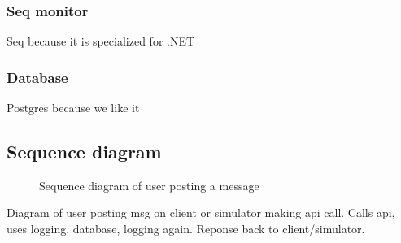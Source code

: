 \subsubsection{Seq monitor}

Seq\cite{seq} because it is specialized for .NET

\subsubsection{Database}

Postgres because we like it


\subsection{Sequence diagram}
\begin{figure}[H]
    \centering
    
    \caption{Sequence diagram of user posting a message}
    \label{fig:seq_diagram}
\end{figure}

Diagram of user posting msg on client or simulator making api call. 
Calls api, uses logging, database, logging again. Reponse back to client/simulator.
